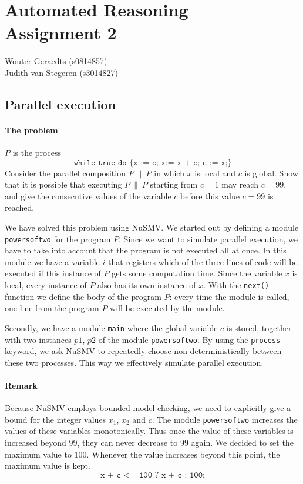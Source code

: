 \documentclass[12pt]{article}
\begin{document}
\section*{Automated Reasoning\\Assignment 2}

\begin{center}
Wouter Geraedts (s0814857) \\
Judith van Stegeren (s3014827)\\
\end{center}

\vspace{8mm}

\subsection*{Parallel execution}
\paragraph{The problem}
$P$ is the process
\[\texttt{while true do \{x := c; x:= x + c; c := x;\}}\]
Consider the parallel composition $P~\|~P$ in which $x$ is 
local and $c$ is global.
Show that it is possible that executing $P~\|~P$ starting from 
$c=1$ may reach $c=99$, 
and give the consecutive values of the variable $c$ 
before this value $c=99$ is reached.

We have solved this problem using NuSMV. 
We started out by defining a module \texttt{powersoftwo} for the program $P$.
Since we want to simulate parallel execution, 
we have to take into account that the program is not executed all at once. 
In this module we have a variable $i$ 
that registers which of the three lines of code will be executed 
if this instance of $P$ gets some computation time. 
Since the variable $x$ is local, 
every instance of $P$ also has its own instance of $x$.
With the \texttt{next()} function we define the body of the program $P$: every time the module is called, one line from the program $P$ will be executed by the module.

Secondly, we have a module \texttt{main} where
the global variable $c$ is stored, 
together with two instances $p1$, $p2$ of the module \texttt{powersoftwo}.
By using the \texttt{process} keyword, 
we ask NuSMV to repeatedly choose non-deterministically 
between these two processes. 
This way we effectively simulate parallel execution.

\paragraph{Remark}
Because NuSMV employs bounded model checking, we need to explicitly give a bound for the integer values $x_1$, $x_2$ and $c$.
The module \texttt{powersoftwo} increases the values of these variables monotonically.
Thus once the value of these variables is increased beyond $99$, they can never decrease to $99$ again.
We decided to set the maximum value to $100$.
Whenever the value increases beyond this point, the maximum value is kept.
\[\texttt{x + c <= 100 ? x + c : 100;}\]
\end{document}
